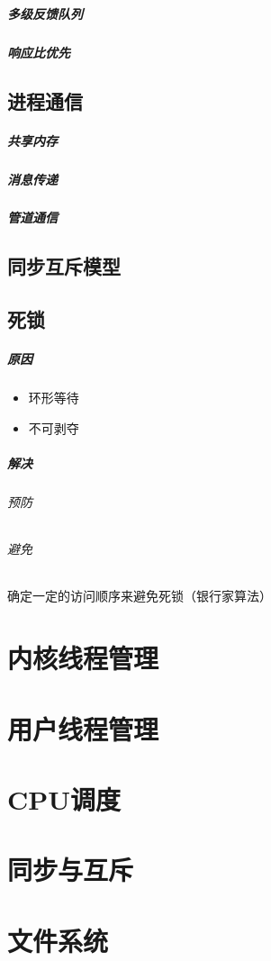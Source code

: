 \documentclass[UTF8,a4paper,12pt]{ctexbook}
\begin{document}
		\paragraph{多级反馈队列}
		
		\paragraph{响应比优先}
		
	\section{进程通信}
		\paragraph{共享内存}
		
		\paragraph{消息传递}
		
		\paragraph{管道通信}
	
	\section{同步互斥模型}

	\section{死锁}
		\paragraph{原因}
			\begin{itemize}
				\item 环形等待
				\item 不可剥夺
			\end{itemize}
			
		\paragraph{解决}
			\subparagraph{预防}
	
			\subparagraph{避免} 确定一定的访问顺序来避免死锁（银行家算法）

\chapter{内核线程管理}

\chapter{用户线程管理}

\chapter{CPU调度}

\chapter{同步与互斥}

\chapter{文件系统}
			    
\end{document}
